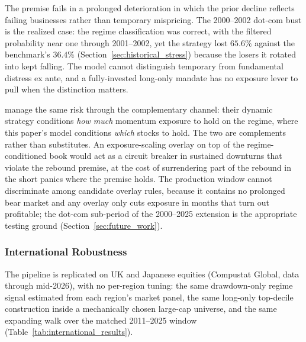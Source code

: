 The premise fails in a prolonged deterioration in which the prior decline reflects failing businesses rather than temporary mispricing. The 2000--2002 dot-com bust is the realized case: the regime classification was correct, with the filtered probability near one through 2001--2002, yet the strategy lost $65.6\%$ against the benchmark's $36.4\%$ (Section~\ref{sec:historical_stress}) because the losers it rotated into kept falling. The model cannot distinguish temporary from fundamental distress ex ante, and a fully-invested long-only mandate has no exposure lever to pull when the distinction matters.

\citet{DanielMoskowitz2016} manage the same risk through the complementary channel: their dynamic strategy conditions \emph{how much} momentum exposure to hold on the regime, where this paper's model conditions \emph{which} stocks to hold. The two are complements rather than substitutes. An exposure-scaling overlay on top of the regime-conditioned book would act as a circuit breaker in sustained downturns that violate the rebound premise, at the cost of surrendering part of the rebound in the short panics where the premise holds. The production window cannot discriminate among candidate overlay rules, because it contains no prolonged bear market and any overlay only cuts exposure in months that turn out profitable; the dot-com sub-period of the 2000--2025 extension is the appropriate testing ground (Section~\ref{sec:future_work}).

\subsubsection{International Robustness}\label{sec:international}

The pipeline is replicated on UK and Japanese equities (Compustat Global, data through mid-2026), with no per-region tuning: the same drawdown-only regime signal estimated from each region's market panel, the same long-only top-decile construction inside a mechanically chosen large-cap universe, and the same expanding walk over the matched 2011--2025 window (Table~\ref{tab:international_results}).



